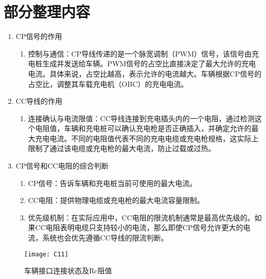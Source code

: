 \section{部分整理内容}
    \begin{enumerate}
        \item  CP信号的作用
            \begin{enumerate}
                \item  控制与通信：CP导线传递的是一个脉宽调制（PWM）信号，该信号由充电桩生成并发送给车辆。PWM信号的占空比直接决定了最大允许的充电电流。具体来说，占空比越高，表示允许的电流越大。车辆根据CP信号的占空比，调整其车载充电机（OBC）的充电电流。
            \end{enumerate}
        \item  CC导线的作用
            \begin{enumerate}
                \item 连接确认与电流限值：CC导线连接到充电插头内的一个电阻，通过检测这个电阻值，车辆和充电桩可以确认充电枪是否正确插入，并确定允许的最大充电电流。不同的电阻值代表不同的充电电缆或充电枪规格，这实际上限制了通过该电缆或充电枪的最大电流，防止过载或过热。  
            \end{enumerate}
        \item CP信号和CC电阻的综合判断
            \begin{enumerate}
                \item CP信号：告诉车辆和充电桩当前可使用的最大电流。
                \item CC电阻：提供物理电缆或充电枪的最大电流容量限制。
                \item 优先级机制：在实际应用中，CC电阻的限流机制通常是最高优先级的。如果CC电阻表明电缆只支持较小的电流，那么即使CP信号允许更大的电流，系统也会优先遵循CC导线的限流判断。
            \end{enumerate}
    \end{enumerate}

    \begin{figure}[!htbp]
        \centering
        \texttt{[image: C11]}
        \caption{车辆接口连接状态及Rc阻值\cite{GB18487_1}}
        \label{fig:C11}
    \end{figure}

